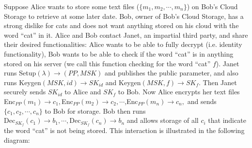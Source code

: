 \documentclass[12pt,twoside]{reedthesis}
\newcommand{\dec}[0]{\text{Dec}}
\begin{document}
\par Suppose Alice wants to store some text files ($\{m_1,m_2,\cdots, m_n \}$) on Bob's Cloud Storage to retrieve at some later date.
 Bob, owner of Bob's Cloud Storage, has a strong dislike for cats and does not want anything stored on
  his cloud with the word ``cat'' in it. Alice and Bob contact Janet, an impartial third party, and share their desired functionalities: Alice wants to be able to fully decrypt (i.e. identity functionality), Bob wants to be able to check if the word ``cat'' is in anything stored on his server (we call this function checking for the word ``cat'' $f$). Janet runs Setup$(\lambda)\rightarrow (PP, MSK)$ and publishes the public parameter, and also runs Keygen$(MSK,id) \rightarrow SK_{id}$ and Keygen$(MSK,f) \rightarrow SK_f$. Then Janet securely sends $SK_{id}$ to Alice and $SK_{f}$ to Bob. Now Alice encrypts her text files Enc$_{PP}(m_1) \rightarrow c_1,$Enc$_{PP}(m_2) \rightarrow c_2, \cdots $,Enc$_{PP}(m_n) \rightarrow c_n,$ and sends $\{c_1,c_2, \cdots, c_n \}$ to Bob for storage. Bob then runs $\dec_{SK_f}(c_1) \rightarrow b_1 , \cdots, \dec_{SK_f}(c_n) \rightarrow b_n $ and allows storage of all $c_i$ that indicate the word ``cat'' is not being stored.  This interaction is illustrated in the following diagram:
  
  
\end{document}
